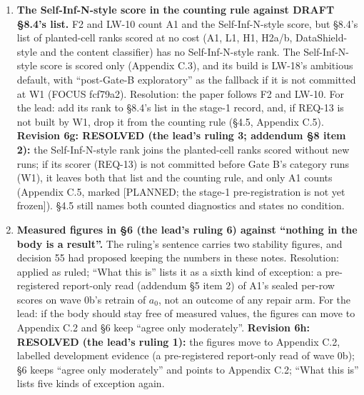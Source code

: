 \documentclass{article}
\theoremstyle{plain}
\theoremstyle{definition}
\theoremstyle{remark}
\begin{document}
\begin{enumerate}
{        narrowing.} \S{}8.6 keeps every scorer's hit rate as an output, and F2
        changes only what counts as finding the cause. Resolution: ``each
        scorer's top-$k$ hit rate'' in \S{}4.5 and Appendix C.5; the counting
        rule is its own sentence.
  \item \textbf{The Self-Inf-N-style score in the counting rule against DRAFT
        \S{}8.4's list.} F2 and LW-10 count A1 and the Self-Inf-N-style score,
        but \S{}8.4's list of planted-cell ranks scored at no cost (A1, L1, H1,
        H2a/b, DataShield-style and the content classifier) has no
        Self-Inf-N-style rank. The Self-Inf-N-style score is scored only
        (Appendix C.3), and its build is LW-18's ambitious default, with
        ``post-Gate-B exploratory'' as the fallback if it is not committed at W1
        (FOCUS fcf79a2). Resolution: the paper follows F2 and LW-10. For the
        lead: add its rank to \S{}8.4's list in the stage-1 record, and, if
        REQ-13 is not built by W1, drop it from the counting rule (\S{}4.5,
        Appendix C.5). \textbf{Revision 6g: RESOLVED (the lead's ruling 3;
        addendum \S{}8 item 2):} the Self-Inf-N-style rank joins the
        planted-cell ranks scored without new runs; if its scorer (REQ-13) is
        not committed before Gate B's category runs (W1), it leaves both that
        list and the counting rule, and only A1 counts (Appendix C.5, marked
        [PLANNED; the stage-1 pre-registration is not yet frozen]). \S{}4.5
        still names both counted diagnostics and states no condition.
  \item \textbf{Measured figures in \S{}6 (the lead's ruling 6) against
        ``nothing in the body is a result''.} The ruling's sentence carries two
        stability figures, and decision 55 had proposed keeping the numbers in
        these notes. Resolution: applied as ruled; ``What this is'' lists it as
        a sixth kind of exception: a pre-registered report-only read (addendum
        \S{}5 item 2) of A1's sealed per-row scores on wave 0b's retrain of
        $a_0$, not an outcome of any repair arm. For the lead: if the body
        should stay free of measured values, the figures can move to Appendix
        C.2 and \S{}6 keep ``agree only moderately''. \textbf{Revision 6h:
        RESOLVED (the lead's ruling 1):} the figures move to Appendix C.2,
        labelled development evidence (a pre-registered report-only read of wave
        0b); \S{}6 keeps ``agree only moderately'' and points to Appendix C.2;
        ``What this is'' lists five kinds of exception again.

\end{enumerate}
\end{document}
